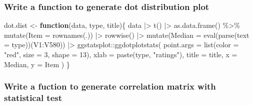 \documentclass[
]{article}
\newenvironment{Shaded}{\begin{snugshade}}{\end{snugshade}}
\newcommand{\AttributeTok}[1]{\textcolor[rgb]{0.77,0.63,0.00}{#1}}
\newcommand{\ControlFlowTok}[1]{\textcolor[rgb]{0.13,0.29,0.53}{\textbf{#1}}}
\newcommand{\DecValTok}[1]{\textcolor[rgb]{0.00,0.00,0.81}{#1}}
\newcommand{\FunctionTok}[1]{\textcolor[rgb]{0.00,0.00,0.00}{#1}}
\newcommand{\NormalTok}[1]{#1}
\newcommand{\OtherTok}[1]{\textcolor[rgb]{0.56,0.35,0.01}{#1}}
\newcommand{\SpecialCharTok}[1]{\textcolor[rgb]{0.00,0.00,0.00}{#1}}
\newcommand{\StringTok}[1]{\textcolor[rgb]{0.31,0.60,0.02}{#1}}
\begin{document}
\hypertarget{write-a-function-to-generate-dot-distribution-plot}{%
\subsubsection{Write a function to generate dot distribution plot}\label{write-a-function-to-generate-dot-distribution-plot}}

\begin{Shaded}
\begin{Highlighting}[]
\NormalTok{dot.dist }\OtherTok{\textless{}{-}} 
  \ControlFlowTok{function}\NormalTok{(data, type, title)\{}
\NormalTok{    data }\SpecialCharTok{|\textgreater{}}
      \FunctionTok{t}\NormalTok{() }\SpecialCharTok{|\textgreater{}} 
      \FunctionTok{as.data.frame}\NormalTok{() }\SpecialCharTok{\%\textgreater{}\%} 
      \FunctionTok{mutate}\NormalTok{(}\AttributeTok{Item =} \FunctionTok{rownames}\NormalTok{(.)) }\SpecialCharTok{|\textgreater{}} 
      \FunctionTok{rowwise}\NormalTok{() }\SpecialCharTok{|\textgreater{}} 
      \FunctionTok{mutate}\NormalTok{(}\AttributeTok{Median =} \FunctionTok{eval}\NormalTok{(}\FunctionTok{parse}\NormalTok{(}\AttributeTok{text =}\NormalTok{ type))(V1}\SpecialCharTok{:}\NormalTok{V580)) }\SpecialCharTok{|\textgreater{}} 
\NormalTok{      ggstatsplot}\SpecialCharTok{::}\FunctionTok{ggdotplotstats}\NormalTok{(}
        \AttributeTok{point.args =} \FunctionTok{list}\NormalTok{(}\AttributeTok{color =} \StringTok{"red"}\NormalTok{, }\AttributeTok{size =} \DecValTok{3}\NormalTok{, }\AttributeTok{shape =} \DecValTok{13}\NormalTok{),}
        \AttributeTok{xlab =} \FunctionTok{paste}\NormalTok{(type, }\StringTok{"ratings"}\NormalTok{),}
        \AttributeTok{title =}\NormalTok{ title,}
        \AttributeTok{x =}\NormalTok{ Median,}
        \AttributeTok{y =}\NormalTok{ Item}
\NormalTok{      )}
\NormalTok{    \}}
\end{Highlighting}
\end{Shaded}

\hypertarget{write-a-fuction-to-generate-correlation-matrix-with-statistical-test}{%
\subsubsection{Write a fuction to generate correlation matrix with statistical test}\label{write-a-fuction-to-generate-correlation-matrix-with-statistical-test}}
\end{document}
